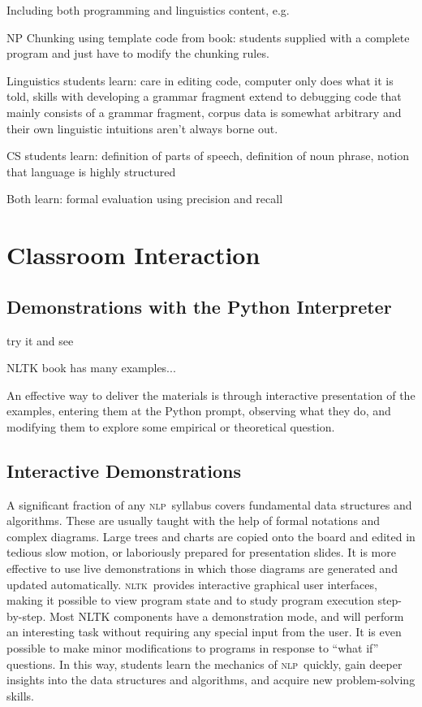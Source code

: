 \documentclass[11pt]{article}
\newcommand{\NLP}{\textsc{nlp}}
\newcommand{\NLTK}{\textsc{nltk}}
\begin{document}
Including both programming and linguistics content, e.g.

NP Chunking using template code from book: students supplied with a
complete program and just have to modify the chunking rules.

Linguistics students learn: care in editing code, computer only does what it is told,
skills with developing a grammar fragment extend to debugging code that mainly consists
of a grammar fragment,
corpus data is somewhat arbitrary and their own linguistic intuitions aren't always
borne out.

CS students learn: definition of parts of speech, definition of noun phrase, notion that
language is highly structured

Both learn: formal evaluation using precision and recall


\section{Classroom Interaction}
\label{sec:classroom-interaction}

\subsection{Demonstrations with the Python Interpreter}

try it and see

NLTK book has many examples...

An effective way to deliver the materials is through interactive
presentation of the examples, entering them at the Python prompt,
observing what they do, and modifying them to explore some empirical
or theoretical question.


\subsection{Interactive Demonstrations}

A significant fraction of any \NLP\ syllabus covers fundamental data
structures and algorithms. These are usually taught with the help of
formal notations and complex diagrams. Large trees and charts are
copied onto the board and edited in tedious slow motion, or
laboriously prepared for presentation slides. It is more effective to
use live demonstrations in which those diagrams are generated and
updated automatically. \NLTK\ provides interactive graphical user
interfaces, making it possible to view program state and to study
program execution step-by-step. Most NLTK components have a
demonstration mode, and will perform an interesting task without
requiring any special input from the user. It is even possible to make
minor modifications to programs in response to ``what if'' questions. In
this way, students learn the mechanics of \NLP\ quickly, gain deeper
insights into the data structures and algorithms, and acquire new
problem-solving skills.
\end{document}
